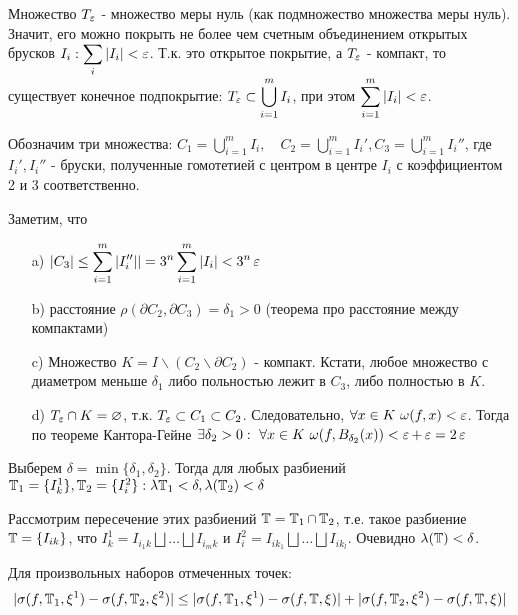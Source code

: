 \documentclass[a4paper]{article}
\begin{document}
\begin{itemize}
    Множество $T_{\operatorname{\varepsilon}}$ - множество меры нуль (как подмножество множества меры нуль). Значит, его можно покрыть не более чем счетным объединением открытых брусков $I_i: \displaystyle\sum_i|I_i| < \ve$. Т.к. это открытое покрытие, а $T_{\operatorname{\varepsilon}}$ - компакт, то существует конечное подпокрытие: $T_{\operatorname{\varepsilon}} \subset \displaystyle\bigcup_{i=1}^m I_i$, при этом $\displaystyle\sum_{i=1}^m |I_i| < \ve$.

    Обозначим три множества: $C_1 = \displaystyle\bigcup_{i=1}^mI_i, \quad C_2 = \displaystyle\bigcup_{i=1}^mI_i', C_3 = \displaystyle\bigcup_{i=1}^mI_i''$, где $I_i', I_i''$ - бруски, полученные гомотетией с центром в центре $I_i$ с коэффициентом 2 и 3 соответственно.

    Заметим, что
    \begin{itemize}
        \item[a)] $|C_3| \le \displaystyle\sum_{i=1}^m|I_i''|| = 3^n \displaystyle\sum_{i=1}^m|I_i| < 3^n \ve$
        \item[b)] расстояние $\rho(\partial C_2, \partial C_3) = \delta_1 > 0$ (теорема про расстояние между компактами)
        \item[c)] Множество $K = I\backslash(C_2\backslash \partial C_2)$ - компакт. Кстати, любое множество с диаметром меньше $\delta_1$ либо польностью лежит в $C_3$, либо полностью в $K$.
        \item[d)] $T_{\operatorname{\varepsilon}} \cap K = \varnothing$, т.к. $T_{\operatorname{\varepsilon}} \subset C_1 \subset C_2$. Следовательно, $\forall x\in K \,\, \omega(f, x) < \operatorname{\varepsilon}$. Тогда по теореме Кантора-Гейне $\exists \delta_2 > 0: \,\, \forall x\in K \,\, \omega(f, B_{\delta_2}(x)) < \operatorname{\varepsilon} + \operatorname{\varepsilon} = 2\operatorname{\varepsilon}$
    \end{itemize}

    Выберем $\delta = \min\{\delta_1, \delta_2\}$. Тогда для любых разбиений $\operatorname{\mathbb{T}}_1 = \{I_k^1\}, \operatorname{\mathbb{T}}_2 = \{I_i^2\}: \lambda{\operatorname{\mathbb{T}}_1} < \delta, \lambda(\operatorname{\mathbb{T}}_2) < \delta$

    Рассмотрим пересечение этих разбиений $\operatorname{\mathbb{T}} = \operatorname{\mathbb{T}}_1 \cap \operatorname{\mathbb{T}}_2$, т.е. такое разбиение $\operatorname{\mathbb{T}} = \{I_{ik}\}$, что $I_k^1 = I_{i_1k} \bigsqcup\ldots\bigsqcup I_{i_mk}$ и $I_i^2 = I_{ik_1} \bigsqcup \ldots\bigsqcup I_{ik_l}$. Очевидно $\lambda(\operatorname{\mathbb{T}}) < \delta$.

    Для произвольных наборов отмеченных точек:
    \begin{equation*}
        |\sigma(f, \operatorname{\mathbb{T}}_1, \xi^1) - \sigma(f, \operatorname{\mathbb{T}}_2, \xi^2)| \le |\sigma(f, \operatorname{\mathbb{T}}_1, \xi^1) - \sigma(f, \operatorname{\mathbb{T}}, \xi)| + |\sigma(f, \operatorname{\mathbb{T}}_2, \xi^2) - \sigma(f, \operatorname{\mathbb{T}}, \xi)|
    \end{equation*}


\end{itemize}
\end{document}
